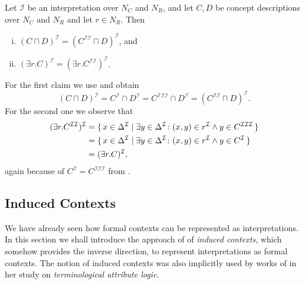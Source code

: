 \begin{Proposition}
  \label{prop:double-II-under-I}
  Let $\mathcal{I}$ be an interpretation over $N_C$ and $N_R$, and let $C, D$ be \ELgfpbot
  concept descriptions over $N_C$ and $N_R$ and let $r \in N_R$.  Then
  \begin{enumerate}[i. ]
  \item $(C \sqcap D)^{\mathcal{I}} = (C^{\mathcal{I}\mathcal{I}} \sqcap
    D)^{\mathcal{I}}$, and
  \item $(\exists r. C)^{\mathcal{I}} = (\exists r. C^{\mathcal{I}\mathcal{I}})^{\mathcal{I}}$.
  \end{enumerate}
\end{Proposition}
\begin{Proof}
  For the first claim we use  and obtain
  \begin{equation*}
    (C \sqcap D)^{\mathcal{I}} = C^{\mathcal{I}} \cap D^{\mathcal{I}} =
    C^{\mathcal{I}\mathcal{I}\mathcal{I}} \cap D^{\mathcal{I}} =
    (C^{\mathcal{I}\mathcal{I}} \sqcap D)^{\mathcal{I}}.
  \end{equation*}
  For the second one we observe that
  \begin{align*}
    (\exists r. C^{\mathcal{I}\mathcal{I}})^{\mathcal{I}}
    &= {\{\, x \in \Delta^{\mathcal{I}} \mid \exists y \in \Delta^{\mathcal{I}} \colon (x, y)
      \in r^{\mathcal{I}} \wedge y \in C^{\mathcal{I}\mathcal{I}\mathcal{I}} \,\}}\\
    &= {\{\, x \in \Delta^{\mathcal{I}} \mid \exists y \in \Delta^{\mathcal{I}} \colon (x, y)
      \in r^{\mathcal{I}} \wedge y \in C^{\mathcal{I}} \,\}} \\
    &= (\exists r. C)^{\mathcal{I}},
  \end{align*}
  again because of $C^{\mathcal{I}} = C^{\mathcal{I}\mathcal{I}\mathcal{I}}$ from
  .
\end{Proof}


\subsection{Induced Contexts}
\label{sec:induced-contexts}

We have already seen how formal contexts can be represented as interpretations.  In this
section we shall introduce the approach of \textcite{Diss-Felix} of \emph{induced
  contexts}, which somehow provides the inverse direction, \ie to represent
interpretations as formal contexts.  The notion of induced contexts was also implicitly
used by works of \textcite{books/math/Prediger00} in her study on \emph{terminological
  attribute logic}.

